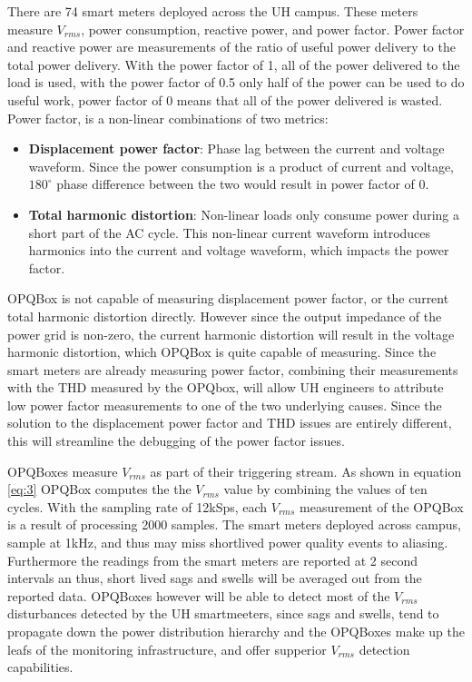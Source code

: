 There are 74 smart meters deployed across the UH campus. These meters measure $V_{rms}$, power consumption, reactive power, and power factor. Power factor and reactive power are measurements of the ratio of useful power delivery to the total power delivery. With the power factor of 1, all of the power delivered to the load is used, with the power factor of 0.5 only half of the power can be used to do useful work, power factor of 0 means that all of the power delivered is wasted. Power factor, is a non-linear combinations of two metrics:
\begin{itemize}
  \item \textbf{Displacement power factor}: Phase lag between the current and voltage waveform. Since the power consumption is a product of current and voltage, $180^{\circ}$ phase difference between the two would result in power factor of 0.
  \item \textbf{Total harmonic distortion}: Non-linear loads only consume power during a short part of the AC cycle. This non-linear current waveform introduces harmonics into the current and voltage waveform, which impacts the power factor.
\end{itemize}
OPQBox is not capable of measuring displacement power factor, or the current total harmonic distortion directly. However since the output impedance of the power grid is non-zero, the current harmonic distortion will result in the voltage harmonic distortion, which OPQBox is quite capable of measuring. Since the smart meters are already measuring power factor, combining their measurements with the THD measured by the OPQbox, will allow UH engineers to attribute low power factor measurements to one of the two underlying causes. Since the solution to the displacement power factor and THD issues are entirely different, this will streamline the debugging of the power factor issues.

OPQBoxes measure $V_{rms}$ as part of their triggering stream. As shown in equation \ref{eq:3} OPQBox computes the the $V_{rms}$ value by combining the values of ten cycles. With the sampling rate of 12kSps, each $V_{rms}$ measurement of the OPQBox is a result of processing 2000 samples. The smart meters deployed across campus, sample at 1kHz, and thus may miss shortlived power quality events to aliasing. Furthermore the readings from the smart meters are reported at 2 second intervals an thus, short lived sags and swells will be averaged out from the reported data. OPQBoxes however will be able to detect most of the $V_{rms}$ disturbances detected by the UH smartmeeters, since sags and swells, tend to propagate down the power distribution hierarchy and the OPQBoxes make up the leafs of the monitoring infrastructure, and offer supperior $V_{rms}$ detection capabilities.


